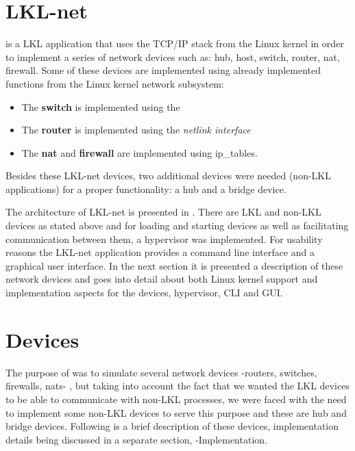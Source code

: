 \begin{itemize}
\section{LKL-net}
\label{sec:lkl-net}
\textbf{\project} is a LKL application that uses the  TCP/IP stack from the Linux kernel in order to implement a series of network devices such as: hub, host, switch, router, nat, firewall. Some of these devices are implemented using already implemented functions from the Linux kernel network subsystem: 
\begin{itemize}
\item The \textbf{switch} is implemented using the 
\item The \textbf{router} is implemented using the \textit{netlink interface}
\item The \textbf{nat} and \textbf{firewall} are implemented using ip_tables. 
\end{itemize} 
Besides these LKL-net devices, two additional devices were needed (non-LKL applications) for a proper functionality: a hub and a bridge device.

The architecture of LKL-net is presented in .
There are LKL and non-LKL devices as stated above and for loading and starting devices as well as facilitating communication between them, a hypervisor was implemented. For usability reasons the LKL-net application provides a command line interface and a graphical user interface.
In the next section it is presented a description of these network devices and  goes into detail about both Linux kernel support and implementation aspects for the devices, hypervisor, CLI and GUI. 
\section{Devices}
\label{sec:devices}
The purpose of \project was to simulate several network devices -routers, switches, firewalls, nats- , but taking into account the fact that we wanted the LKL devices to be able to communicate with non-LKL processes, we were faced with the need to implement some non-LKL devices to serve this purpose and these are hub and bridge devices.
Following is a brief description of these devices, implementation details being discussed in a separate section,  -Implementation.

\end{itemize}
